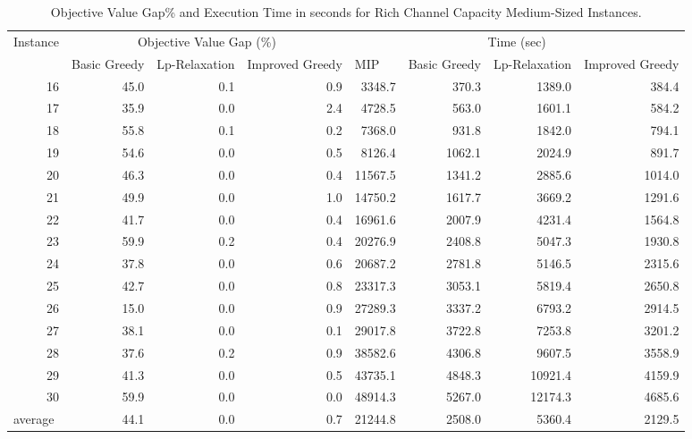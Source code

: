 \documentclass[11pt]{article}
\begin{document}
\begin{table}[htbp]
  \centering
  \caption{Objective Value Gap\% and Execution Time in seconds for Rich Channel Capacity Medium-Sized Instances.}\label{table:tbl_exact_rich_results_medium}
    \begin{adjustbox}{max width=1\textwidth}
    \begin{tabular}{|l|rrr|rrrr|}
    \toprule
    \multicolumn{1}{|c|}{\multirow{2}[4]{*}{Instance}} & \multicolumn{3}{c|}{Objective Value Gap (\%)} & \multicolumn{4}{c|}{Time (sec)} \\
\cmidrule{2-8}          & \multicolumn{1}{l}{Basic Greedy} & \multicolumn{1}{l}{Lp-Relaxation} & \multicolumn{1}{l|}{Improved Greedy} & \multicolumn{1}{l}{MIP} & \multicolumn{1}{l}{Basic Greedy} & \multicolumn{1}{l}{Lp-Relaxation} & \multicolumn{1}{l|}{Improved Greedy} \\
    \midrule
    \multicolumn{1}{|r|}{16} & 45.0    & 0.1   & 0.9   & 3348.7 & 370.3 & 1389.0  & 384.4 \\
    \multicolumn{1}{|r|}{17} & 35.9  & 0.0     & 2.4   & 4728.5 & 563.0   & 1601.1 & 584.2 \\
    \multicolumn{1}{|r|}{18} & 55.8  & 0.1   & 0.2   & 7368.0  & 931.8 & 1842.0  & 794.1 \\
    \multicolumn{1}{|r|}{19} & 54.6  & 0.0     & 0.5   & 8126.4 & 1062.1 & 2024.9 & 891.7 \\
    \multicolumn{1}{|r|}{20} & 46.3  & 0.0     & 0.4   & 11567.5 & 1341.2 & 2885.6 & 1014.0 \\
    \multicolumn{1}{|r|}{21} & 49.9  & 0.0     & 1.0     & 14750.2 & 1617.7 & 3669.2 & 1291.6 \\
    \multicolumn{1}{|r|}{22} & 41.7  & 0.0     & 0.4   & 16961.6 & 2007.9 & 4231.4 & 1564.8 \\
    \multicolumn{1}{|r|}{23} & 59.9  & 0.2   & 0.4   & 20276.9 & 2408.8 & 5047.3 & 1930.8 \\
    \multicolumn{1}{|r|}{24} & 37.8  & 0.0     & 0.6   & 20687.2 & 2781.8 & 5146.5 & 2315.6 \\
    \multicolumn{1}{|r|}{25} & 42.7  & 0.0     & 0.8   & 23317.3 & 3053.1 & 5819.4 & 2650.8 \\
    \multicolumn{1}{|r|}{26} & 15.0    & 0.0     & 0.9   & 27289.3 & 3337.2 & 6793.2 & 2914.5 \\
    \multicolumn{1}{|r|}{27} & 38.1  & 0.0     & 0.1   & 29017.8 & 3722.8 & 7253.8 & 3201.2 \\
    \multicolumn{1}{|r|}{28} & 37.6  & 0.2   & 0.9   & 38582.6 & 4306.8 & 9607.5 & 3558.9 \\
    \multicolumn{1}{|r|}{29} & 41.3  & 0.0     & 0.5   & 43735.1 & 4848.3 & 10921.4 & 4159.9 \\
    \multicolumn{1}{|r|}{30} & 59.9  & 0.0     & 0.0     & 48914.3 & 5267.0  & 12174.3 & 4685.6 \\
    \midrule
    average & 44.1  & 0.0   & 0.7   & 21244.8 & 2508.0 & 5360.4 & 2129.5 \\
    \bottomrule
    \end{tabular}
    \end{adjustbox}
\end{table}
\end{document}
